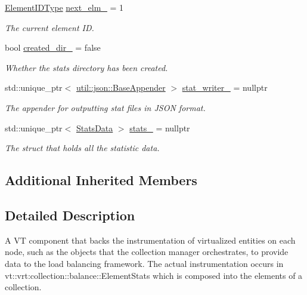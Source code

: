 \begin{DoxyCompactItemize}
\hyperlink{namespacevt_1_1vrt_1_1collection_1_1balance_a592736f733df4f90856df90a1fd08905}{Element\+I\+D\+Type} \hyperlink{structvt_1_1vrt_1_1collection_1_1balance_1_1_node_stats_a7b1b992f34d07739e854c95ef921f0ab}{next\+\_\+elm\+\_\+} = 1
\begin{DoxyCompactList}\small\item\em The current element ID. \end{DoxyCompactList}\item 
bool \hyperlink{structvt_1_1vrt_1_1collection_1_1balance_1_1_node_stats_a41cafe7ec8557587a5e922c2289de342}{created\+\_\+dir\+\_\+} = false
\begin{DoxyCompactList}\small\item\em Whether the stats directory has been created. \end{DoxyCompactList}\item 
std\+::unique\+\_\+ptr$<$ \hyperlink{structvt_1_1util_1_1json_1_1_base_appender}{util\+::json\+::\+Base\+Appender} $>$ \hyperlink{structvt_1_1vrt_1_1collection_1_1balance_1_1_node_stats_ac55b2919f97d6e8eab3eb21bb764cf93}{stat\+\_\+writer\+\_\+} = nullptr
\begin{DoxyCompactList}\small\item\em The appender for outputting stat files in J\+S\+ON format. \end{DoxyCompactList}\item 
std\+::unique\+\_\+ptr$<$ \hyperlink{structvt_1_1vrt_1_1collection_1_1balance_1_1_stats_data}{Stats\+Data} $>$ \hyperlink{structvt_1_1vrt_1_1collection_1_1balance_1_1_node_stats_abccd8e4bb739d694e6db03dc5c005c93}{stats\+\_\+} = nullptr
\begin{DoxyCompactList}\small\item\em The struct that holds all the statistic data. \end{DoxyCompactList}\end{DoxyCompactItemize}
\subsection*{Additional Inherited Members}


\subsection{Detailed Description}
A VT component that backs the instrumentation of virtualized entities on each node, such as the objects that the collection manager orchestrates, to provide data to the load balancing framework. The actual instrumentation occurs in {\ttfamily vt\+::vrt\+:collection\+:}\+:balance\+::\+Element\+Stats which is composed into the elements of a collection. 

